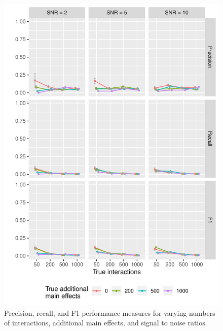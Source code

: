 \begin{figure}
\begin{minipage}{\linewidth}
		\includegraphics[width=0.5\linewidth]{"output/PrecRecF1_n10000_tyes_large1_"}
	\end{minipage}
	\caption{Precision, recall, and F1 performance measures for varying numbers of interactions, additional main effects, and signal to noise ratios.}
\end{figure}




